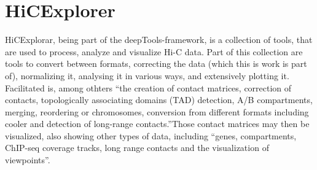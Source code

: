 








% 
% 
% 
% 
% 
\section{HiCExplorer}\label{sec:hicexplorer}

% 
HiCExplorar, being part of the deepTools-framework, is a collection of tools,
that are used to process, analyze and visualize Hi-C data. Part of this
collection are tools to convert between formats, correcting the data (which
this is work is part of), normalizing it, analysing it in various ways, and
extensively plotting it. Facilitated is, among othters ``the creation of
contact matrices, correction of contacts, topologically associating domains
(TAD) detection, A/B compartments, merging, reordering or chromosomes,
conversion from different formats including cooler and detection of long-range
contacts.''\footnotemark Those contact matrices may then be visualized, also
showing other types of data, including ``genes, compartments, ChIP-seq coverage
tracks, long range contacts and the visualization of
viewpoints''\footnotemark[\value{footnote}].

